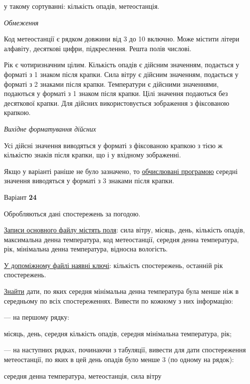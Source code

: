 \documentclass[11pt, ukrainian]{article}
\begin{document}
{\noindent}у такому сортуванні: кількість опадів, метеостанція.


\bigskip\textit{Обмеження}

Код метеостанції є рядком довжини від 3 до 10 включно.
Може містити літери алфавіту, десяткові цифри, підкреслення. Решта полів числові.

Рік є чотиризначним цілим.
Кількість опадів є дійсним значенням, подається у форматі з 1 знаком після крапки.
Сила вітру є дійсним значенням, подається у форматі з 2 знаками після крапки.
Температури є дійсними значеннями, подаються у форматі з 1 знаком після крапки.
Цілі значення подаються без десяткової крапки.
Для дійсних використовується зображення з фіксованою крапкою.

\textit{Вихідне форматування дійсних}

Усі дійсні значення виводяться у форматі з фіксованою крапкою з тією ж кількістю знаків після крапки, що і у вхідному зображенні.

Якщо у варіанті раніше не було зазначено, то \underline{обчислювані програмою} середні значення виводяться у форматі з 3 знаками після крапки.


\par
\newpage
{\center Варіант  \No \textbf { 24 }\par}
\bigskip
Обробляються дані спостережень за погодою. 

\underline{Записи основного файлу містять поля}: сила вітру, місяць, день, кількість опадів, максимальна денна температура, код метеостанції, середня денна температура, рік, мінімальна денна температура, відносна вологість.

\underline{У допоміжному файлі наявні ключі}: кількість спостережень, останній рік спостережень.

\underline{Знайти} дати, по яких середня мінімальна денна температура була менше ніж в середньому по всіх спостереженнях. Вивести по кожному з них інформацію:\par
{\noindent}--- на першому рядку:\par
місяць, день, середня кількість опадів, середня мінімальна температура, рік;

{\noindent}--- на наступних рядках, починаючи з табуляції, вивести для дати спостереження метеостанції, по яких в цей день опадів було менше 3 (по одному на рядок):\par
середня денна температура, метеостанція, сила вітру
\end{document}
